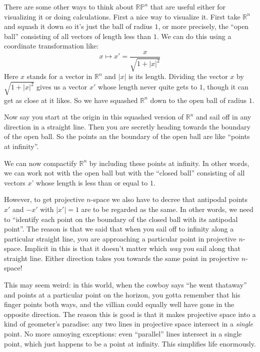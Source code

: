 \documentclass{article}
\begin{document}
There are some other ways to think about \(\mathbb{RP}^n\) that are
useful either for visualizing it or doing calculations. First a nice way
to visualize it. First take \(\mathbb{R}^n\) and squash it down so it's
just the ball of radius \(1\), or more precisely, the ``open ball''
consisting of all vectors of length less than \(1\). We can do this
using a coordinate transformation like:
\[x \mapsto x' =  \frac{x}{\sqrt{1+|x|^2}}\] Here \(x\) stands for a
vector in \(\mathbb{R}^n\) and \(|x|\) is its length. Dividing the
vector \(x\) by \(\sqrt{1 + |x|^2}\) gives us a vector \(x'\) whose
length never quite gets to \(1\), though it can get as close at it
likes. So we have squashed \(\mathbb{R}^n\) down to the open ball of
radius \(1\).

Now say you start at the origin in this squashed version of
\(\mathbb{R}^n\) and sail off in any direction in a straight line. Then
you are secretly heading towards the boundary of the open ball. So the
points an the boundary of the open ball are like ``points at infinity''.

We can now compactify \(\mathbb{R}^n\) by including these points at
infinity. In other words, we can work not with the open ball but with
the ``closed ball'' consisting of all vectors \(x\)' whose length is
less than or equal to \(1\).

However, to get projective \(n\)-space we also have to decree that
antipodal points \(x'\) and \(-x'\) with \(|x'| = 1\) are to be regarded
as the same. In other words, we need to ``identify each point on the
boundary of the closed ball with its antipodal point''. The reason is
that we said that when you sail off to infinity along a particular
straight line, you are approaching a particular point in projective
\(n\)-space. Implicit in this is that it doesn't matter which \emph{way}
you sail along that straight line. Either direction takes you towards
the same point in projective \(n\)-space!

This may seem weird: in this world, when the cowboy says ``he went
thataway'' and points at a particular point on the horizon, you gotta
remember that his finger points both ways, and the villian could equally
well have gone in the opposite direction. The reason this is good is
that it makes projective space into a kind of geometer's paradise: any
two lines in projective space intersect in a \emph{single} point. No
more annoying exceptions: even ``parallel'' lines intersect in a single
point, which just happens to be a point at infinity. This simplifies
life enormously.
\end{document}
